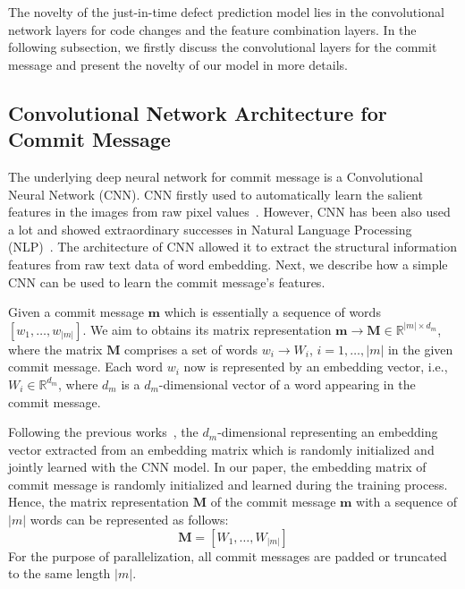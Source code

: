 The novelty of the just-in-time defect prediction model lies in the convolutional network layers for code changes and the feature combination layers. In the following subsection, we firstly discuss the convolutional layers for the commit message and present the novelty of our model in more details. 

\subsection{Convolutional Network Architecture for Commit Message}
\label{sec:cnn_msg}
The underlying deep neural network for commit message is a Convolutional Neural Network (CNN). CNN firstly used to automatically learn the salient features in the images from raw pixel values~\cite{krizhevsky2012imagenet}. However, CNN has been also used a lot and showed extraordinary successes in Natural Language Processing (NLP)~\cite{kim2014convolutional, dos2014deep, kalchbrenner2014convolutional, zhang2015character, johnson2014effective}. The architecture of CNN allowed it to extract the structural information features from raw text data of word embedding. Next, we describe how a simple CNN can be used to learn the commit message's features.

Given a commit message $\textbf{m}$ which is essentially a sequence of words $[w_1, \dots, w_{|m|}]$. We aim to obtains its matrix representation $\textbf{m} \rightarrow \textbf{M} \in \mathbb{R}^{|m| \times d_m}$, where the matrix $\textbf{M}$ comprises a set of words $w_i \rightarrow W_i$, $i = 1, \dots, |m|$ in the given commit message. Each word $w_i$ now is represented by an embedding vector, i.e., $W_i \in \mathbb{R}^{d_m}$, where $d_m$ is a $d_m$-dimensional vector of a word appearing in the commit message. 

Following the previous works~\cite{kim2014convolutional, zhang2015character}, the $d_m$-dimensional representing an embedding vector extracted from an embedding matrix which is randomly initialized and jointly learned with the CNN model. In our paper, the embedding matrix of commit message is randomly initialized and learned during the training process. Hence, the matrix representation $\textbf{M}$ of the commit message $\textbf{m}$ with a sequence of $|m|$ words can be represented as follows:
\begin{equation}
\label{eq:representation_msg}
    \textbf{M} = [W_1, \dots, W_{|m|}]
\end{equation}
For the purpose of parallelization, all commit messages are padded or truncated to the same length $|m|$. 

